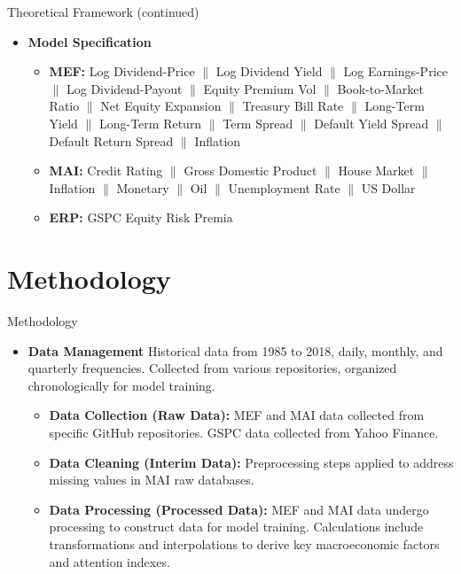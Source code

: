 \documentclass{beamer}
\begin{document}
\begin{frame}{Theoretical Framework (continued)}
  \begin{itemize}
    \item \textbf{Model Specification}
    \newline
      \begin{itemize}
        \item \textbf{MEF:} Log Dividend-Price $\|$ Log Dividend Yield $\|$ Log Earnings-Price $\|$ Log Dividend-Payout $\|$ Equity Premium Vol $\|$ Book-to-Market Ratio $\|$ Net Equity Expansion $\|$ Treasury Bill Rate $\|$ Long-Term Yield $\|$ Long-Term Return $\|$ Term Spread $\|$ Default Yield Spread $\|$ Default Return Spread $\|$ Inflation
        \newline
        \item \textbf{MAI:} Credit Rating $\|$ Gross Domestic Product $\|$ House Market $\|$ Inflation $\|$ Monetary $\|$ Oil $\|$ Unemployment Rate $\|$ US Dollar
        \newline
        \item \textbf{ERP:} GSPC Equity Risk Premia
      \end{itemize}
  \end{itemize}
\end{frame}

\section{Methodology}
\begin{frame}{Methodology}
  \begin{itemize}
    \item \textbf{Data Management}
    \newline
    Historical data from 1985 to 2018, daily, monthly, and quarterly frequencies. Collected from various repositories, organized chronologically for model training.
    \newline
      \begin{itemize}
        \item \textbf{Data Collection (Raw Data):} MEF and MAI data collected from specific GitHub repositories. GSPC data collected from Yahoo Finance.
        \newline
        \item \textbf{Data Cleaning (Interim Data):} Preprocessing steps applied to address missing values in MAI raw databases.
        \newline
        \item \textbf{Data Processing (Processed Data):} MEF and MAI data undergo processing to construct data for model training. Calculations include transformations and interpolations to derive key macroeconomic factors and attention indexes.
      \end{itemize}
  \end{itemize}
\end{frame}
\end{document}

